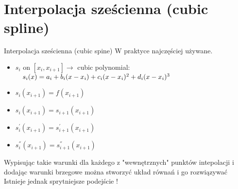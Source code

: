 \section{Interpolacja sześcienna (cubic spline)}
	\begin{frame}{Interpolacja sześcienna (cubic spine)}
	 W praktyce najczęściej używane.
		\begin{block}{}
			\begin{itemize}
				\item $s_{i}$ on $[x_{i},x_{i+1}] \rightarrow$ cubic polynomial:
                $\newline \ \ \ s_{i}(x)=a_{i}+b_{i}(x-x_{i})+c_{i}(x-x_{i})^{2}+
                d_{i}(x-x_{i})^{3}$
                \item $s_{i}(x_{i+1})=f(x_{i+1})$
                \item $s_{i}(x_{i+1})=s_{i+1}(x_{i+1})$
                \item $s^{'}_{i}(x_{i+1})=s^{'}_{i+1}(x_{i+1})$
                \item $s^{''}_{i}(x_{i+1})=s^{''}_{i+1}(x_{i+1})$
			\end{itemize}
		\end{block}
		
		
		Wypisując takie warunki dla każdego z "wewnętrznych"  punktów intepolacji i dodając warunki brzegowe można stworzyć układ równań i go rozwiązywać\\
		Istnieje jednak sprytniejsze podejście !
        
	\end{frame}